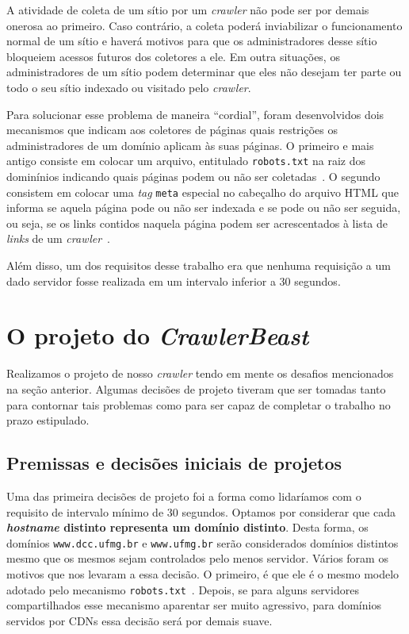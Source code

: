 \documentclass[10pt,twocolumn]{article}
\begin{document}
A atividade de coleta de um sítio por um \emph{crawler} não pode ser por
demais onerosa ao primeiro. Caso contrário, a coleta poderá inviabilizar
o funcionamento normal de um sítio e haverá motivos para que os
administradores desse sítio bloqueiem acessos futuros dos coletores a
ele. Em outra situações, os administradores de um sítio podem determinar
que eles não desejam ter parte ou todo o seu sítio indexado ou visitado
pelo \emph{crawler}.

Para solucionar esse problema de maneira ``cordial'', foram
desenvolvidos dois mecanismos que indicam aos coletores de páginas quais
restrições os administradores de um domínio aplicam às suas páginas. O
primeiro e mais antigo consiste em colocar um arquivo, entitulado
\texttt{robots.txt} na raiz dos dominínios indicando quais páginas podem
ou não ser coletadas~\cite{robotstxt}. O segundo consistem em colocar
uma \emph{tag} \texttt{meta} especial no cabeçalho do arquivo HTML que
informa se aquela página pode ou não ser indexada e se pode ou não ser
seguida, ou seja, se os links contidos naquela página podem ser
acrescentados à lista de \emph{links} de um
\emph{crawler}~\cite{robotsmeta}.

Além disso, um dos requisitos desse trabalho era que nenhuma requisição
a um dado servidor fosse realizada em um intervalo inferior a 30 segundos.



\section{O projeto do \emph{CrawlerBeast}}

Realizamos o projeto de nosso \emph{crawler} tendo em mente os desafios
mencionados na seção anterior. Algumas decisões de projeto tiveram que
ser tomadas tanto para contornar tais problemas como para ser capaz de
completar o trabalho no prazo estipulado.

\subsection{Premissas e decisões iniciais de projetos}

Uma das primeira decisões de projeto foi a forma como lidaríamos com o
requisito de intervalo mínimo de 30 segundos. Optamos por considerar que
cada \textbf{\emph{hostname} distinto representa um domínio distinto}.
Desta forma, os domínios \texttt{www.dcc.ufmg.br} e \texttt{www.ufmg.br}
serão considerados domínios distintos mesmo que os mesmos sejam
controlados pelo menos servidor. Vários foram os motivos que nos levaram
a essa decisão. O primeiro, é que ele é o mesmo modelo adotado pelo
mecanismo \texttt{robots.txt}~\cite{robotstxt}. Depois, se para alguns
servidores compartilhados esse mecanismo aparentar ser muito agressivo,
para domínios servidos por CDNs essa decisão será por demais suave.
\end{document}
